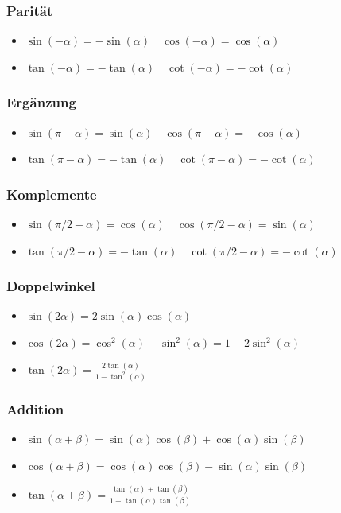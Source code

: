 \documentclass[8pt]{extarticle}
\begin{document}
\begin{multicols*}{3}
\subsubsection{Parität}
\begin{itemize}
 \item $\sin(-\alpha) = - \sin(\alpha) \quad \cos(-\alpha) = \cos(\alpha)$
 \item $\tan(-\alpha) = - \tan(\alpha) \quad \cot(-\alpha) = - \cot(\alpha)$
\end{itemize}

\subsubsection{Ergänzung}
\begin{itemize}
 \item $\sin(\pi - \alpha) = \sin(\alpha) \quad \cos(\pi - \alpha) = - \cos(\alpha)$
 \item $\tan(\pi - \alpha) = -\tan(\alpha) \quad \cot(\pi - \alpha) = - \cot(\alpha)$
\end{itemize}


\subsubsection{Komplemente}
\begin{itemize}
 \item $\sin(\pi/2 - \alpha) = \cos(\alpha) \quad \cos(\pi/2 - \alpha) = \sin(\alpha)$
 \item $\tan(\pi/2 - \alpha) = -\tan(\alpha) \quad \cot(\pi/2 - \alpha) = -\cot(\alpha)$
\end{itemize}

\subsubsection{Doppelwinkel}
\begin{itemize}
 \item $\sin(2\alpha) = 2 \sin(\alpha) \cos(\alpha)$
 \item $\cos(2\alpha) = \cos^2(\alpha) - \sin^2(\alpha) = 1 - 2 \sin^2(\alpha)$
 \item $\tan(2\alpha) = \frac{2\tan(\alpha)}{1 - \tan^2(\alpha)}$
\end{itemize}

\subsubsection{Addition}
\begin{itemize}
 \item $\sin(\alpha + \beta) = \sin(\alpha) \cos(\beta) + \cos(\alpha) \sin(\beta)$
 \item $\cos(\alpha + \beta) = \cos(\alpha) \cos(\beta) - \sin(\alpha) \sin(\beta)$
 \item $\tan(\alpha + \beta) = \frac{\tan(\alpha) + \tan(\beta)}{1 - \tan(\alpha) \tan(\beta)}$
\end{itemize}


\end{multicols*}
\end{document}

